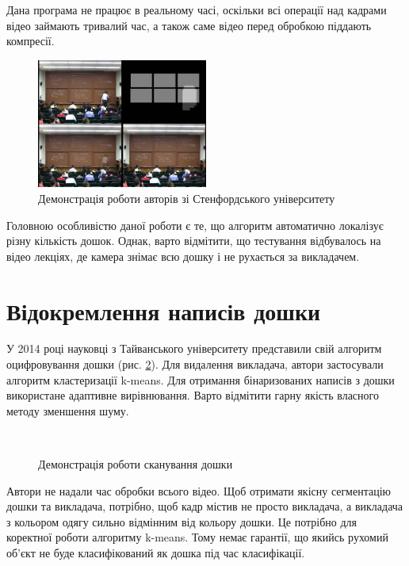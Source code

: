 Дана програма не працює в реальному часі, оскільки всі операції над кадрами
відео займають тривалий час, а також саме відео перед обробкою
піддають компресії.
\begin{figure}[H]
  \centering
  \includegraphics[width=0.5\textwidth]{images/suh}
  \caption{Демонстрація роботи авторів зі Стенфордського університету \cite{bib:suh}
    \label{fig:suh}
  }
\end{figure}
Головною особливістю даної роботи є те, що  алгоритм автоматично локалізує
різну кількість дошок. Однак, варто відмітити, що тестування відбувалось на
відео лекціях, де камера знімає всю дошку і не рухається за викладачем.

\section{Відокремлення написів дошки}
У 2014 році науковці з Тайванського університету представили свій алгоритм \cite{bib:yeh}
оцифровування дошки (рис. \ref{fig:yeh}). Для видалення викладача, автори застосували
алгоритм кластеризації k-means. Для отримання бінаризованих написів з дошки
використане адаптивне вирівнювання. Варто відмітити гарну
якість власного методу зменшення шуму.
\begin{figure}[H]
  \centering
  \\
  \caption{Демонстрація роботи сканування дошки \cite{bib:yeh}
    \label{fig:yeh}
  }
\end{figure}
Автори не надали час обробки всього відео. Щоб отримати якісну сегментацію
дошки та викладача, потрібно, щоб кадр містив не просто викладача, а викладача з кольором одягу
сильно відмінним від кольору дошки. Це потрібно для коректної роботи алгоритму k-means.
Тому немає гарантії, що якийсь рухомий об'єкт не буде класифікований як дошка під час класифікації.

